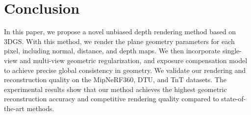 \documentclass[lettersize,journal]{IEEEtran}
\begin{document}
\section{Conclusion}
In this paper, we propose a novel unbiased depth rendering method based on 3DGS. With this method, we render the plane geometry parameters for each pixel, including normal, distance, and depth maps. We then incorporate single-view and multi-view geometric regularization, and exposure compensation model to achieve precise global consistency in geometry. We validate our rendering and reconstruction quality on the MipNeRF360, DTU, and TnT datasets. The experimental results show that our method achieves the highest geometric reconstruction accuracy and competitive rendering quality compared to state-of-the-art methods.














 
%
%

% 



% 

\vfill


\end{document}

